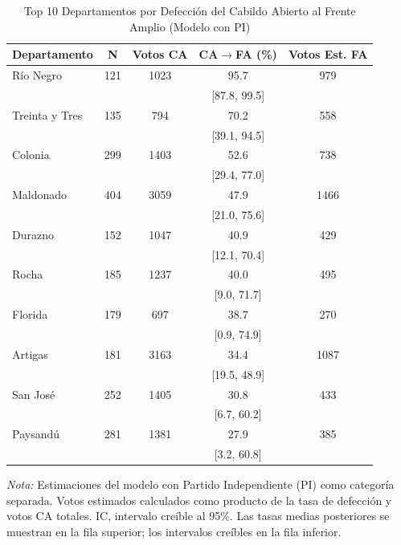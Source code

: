\begin{table}[htbp]
\centering
\caption{Top 10 Departamentos por Defección del Cabildo Abierto al Frente Amplio (Modelo con PI)}
\label{tab:dept_top10}
\begin{tabular}{lS[table-format=4]S[table-format=5]S[table-format=2.1]S[table-format=5.0]}
\toprule
{\textbf{Departamento}} & {\textbf{N}} & {\textbf{Votos CA}} & {\textbf{CA$\rightarrow$FA (\%)}} & {\textbf{Votos Est. FA}} \\
\midrule
Río Negro & 121 & 1023 & 95.7 & 979 \\
 & & & {[87.8, 99.5]} & \\
Treinta y Tres & 135 & 794 & 70.2 & 558 \\
 & & & {[39.1, 94.5]} & \\
Colonia & 299 & 1403 & 52.6 & 738 \\
 & & & {[29.4, 77.0]} & \\
Maldonado & 404 & 3059 & 47.9 & 1466 \\
 & & & {[21.0, 75.6]} & \\
Durazno & 152 & 1047 & 40.9 & 429 \\
 & & & {[12.1, 70.4]} & \\
Rocha & 185 & 1237 & 40.0 & 495 \\
 & & & {[9.0, 71.7]} & \\
Florida & 179 & 697 & 38.7 & 270 \\
 & & & {[0.9, 74.9]} & \\
Artigas & 181 & 3163 & 34.4 & 1087 \\
 & & & {[19.5, 48.9]} & \\
San José & 252 & 1405 & 30.8 & 433 \\
 & & & {[6.7, 60.2]} & \\
Paysandú & 281 & 1381 & 27.9 & 385 \\
 & & & {[3.2, 60.8]} & \\
\bottomrule
\end{tabular}
\begin{flushleft}
\small \textit{Nota:} Estimaciones del modelo con Partido Independiente (PI) como categoría separada. Votos estimados calculados como producto de la tasa de defección y votos CA totales. IC, intervalo creíble al 95\%. Las tasas medias posteriores se muestran en la fila superior; los intervalos creíbles en la fila inferior.
\end{flushleft}
\end{table}
